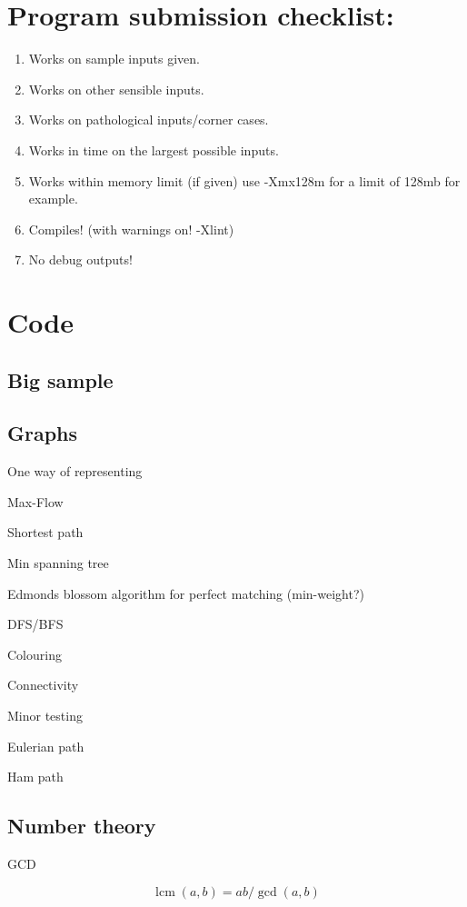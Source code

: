 \documentclass[10pt,a4paper]{article}
\newcommand{\codelisting}[1]{
  }
\DeclareMathOperator{\lcm}{lcm}
\begin{document}
\maketitle
\thispagestyle{myheadings}
\section*{Program submission checklist:}
\begin{enumerate}
\item Works on sample inputs given.
\item Works on other sensible inputs.
\item Works on pathological inputs/corner cases.
\item Works in time on the largest possible inputs.
\item Works within memory limit (if given) use -Xmx128m for a limit of 128mb for example.
\item Compiles! (with warnings on! -Xlint)
\item No debug outputs!
\end{enumerate}
\section*{Code}
\subsection*{Big sample}


\subsection*{Graphs}
One way of representing
\codelisting{graphsample.java}

Max-Flow
\codelisting{fordfulkerson.java}

Shortest path
\codelisting{shortpath.java}

Min spanning tree
\codelisting{kruskal.java}

Edmonds blossom algorithm for perfect matching (min-weight?)
\codelisting{blossom.java}

DFS/BFS
\codelisting{search.java}

Colouring

Connectivity

Minor testing

Eulerian path

Ham path

\subsection*{Number theory}
GCD
\codelisting{gcd.java}
\[\lcm(a,b) = ab/\gcd(a,b)\]
\end{document}
